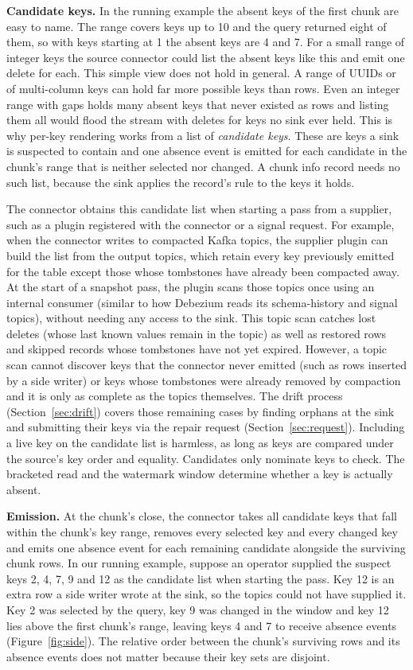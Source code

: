 \documentclass[sigconf,nonacm,10pt]{acmart}
\begin{document}
\textbf{Candidate keys.} In the running example the absent keys of the first
chunk are easy to name. The range covers keys up to 10 and the query returned
eight of them, so with keys starting at 1 the absent keys are 4 and 7. For a
small range of integer keys the source connector could list the absent keys
like this and emit one delete for each. This simple view does not hold in general. A range
of UUIDs or of multi-column keys can hold far more possible keys than rows. 
Even an integer range with gaps holds many absent keys that never
existed as rows and listing them all would flood the stream with deletes for
keys no sink ever held. This is why per-key rendering works from a list of
\emph{candidate keys}. These are keys a sink is suspected to contain and one absence event
is emitted for each candidate in the chunk's range that is neither selected nor changed. A chunk info
record needs no such list, because the sink applies the record's rule to the
keys it holds.

The connector obtains this candidate list when starting a pass from a supplier,
such as a plugin registered with the connector or a signal request. For example,
when the connector writes to compacted Kafka topics, the supplier plugin can
build the list from the output topics, which retain every key previously emitted
for the table except those whose tombstones have already been compacted away. At
the start of a snapshot pass, the plugin scans those topics once using an
internal consumer (similar to how Debezium reads its schema-history and signal
topics), without needing any access to the sink. This topic scan catches lost
deletes (whose last known values remain in the topic) as well as restored rows
and skipped records whose tombstones have not yet expired. However, a topic scan
cannot discover keys that the connector never emitted (such as rows inserted by
a side writer) or keys whose tombstones were already removed by compaction and it is only as complete as the topics themselves. The drift process
(Section~\ref{sec:drift}) covers those remaining cases by finding orphans at the
sink and submitting their keys via the repair request
(Section~\ref{sec:request}). Including a live key on the candidate list is
harmless, as long as keys are compared under the source's key order and
equality. Candidates only nominate keys to check. The bracketed read and the
watermark window determine whether a key is actually absent.

\textbf{Emission.} At the chunk's close, the connector takes all
candidate keys that fall within the chunk's key range, removes every
selected key and every changed key and emits one absence event for each remaining candidate
alongside the surviving chunk rows. In our running example, suppose an operator supplied the suspect keys 2, 4, 7, 9 and 12 as the
candidate list when starting the pass. Key 12 is an extra row a side writer
wrote at the sink, so the topics could not have supplied it. Key 2 was selected by the query, key 9 was changed in the
window and key 12 lies above the first chunk's range, leaving keys 4 and 7 to
receive absence events (Figure~\ref{fig:side}). The relative order between the
chunk's surviving rows and its absence events does not matter because their key
sets are disjoint.
\end{document}
